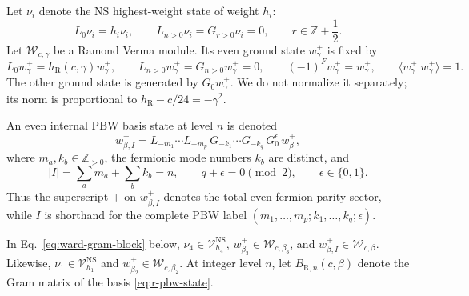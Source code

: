 \documentclass[11pt]{article}
\newcommand{\R}{\mathrm R}
\newcommand{\NS}{\mathrm{NS}}
\begin{document}
Let \(\nu_i\) denote the NS highest-weight state of weight \(h_i\):
\begin{equation}
 L_0\nu_i=h_i\nu_i,\qquad
 L_{n>0}\nu_i=G_{r>0}\nu_i=0,
 \qquad r\in\mathbb Z+\frac12.
 \label{eq:ns-highest-state}
\end{equation}
Let \(\mathcal W_{c,\gamma}\) be a Ramond Verma module.  Its even ground
state \(w_\gamma^+\) is fixed by
\begin{equation}
 L_0w_\gamma^+=h_\R(c,\gamma)w_\gamma^+,\qquad
 L_{n>0}w_\gamma^+=G_{n>0}w_\gamma^+=0,\qquad
 (-1)^F w_\gamma^+=w_\gamma^+,\qquad
 \langle w_\gamma^+|w_\gamma^+\rangle=1.
 \label{eq:r-ground-state}
\end{equation}
The other ground state is generated by \(G_0w_\gamma^+\).  We do not
normalize it separately; its norm is proportional to
\(h_\R-c/24=-\gamma^2\).

An even internal PBW basis state at level \(n\) is denoted
\begin{equation}
 w_{\beta,I}^+
 =
 L_{-m_1}\cdots L_{-m_p}\,
 G_{-k_1}\cdots G_{-k_q}\,
 G_0^{\epsilon}\,w_\beta^+,
 \label{eq:r-pbw-state}
\end{equation}
where \(m_a,k_b\in\mathbb Z_{>0}\), the fermionic mode numbers \(k_b\)
are distinct, and
\begin{equation}
 |I|=\sum_a m_a+\sum_b k_b=n,\qquad
 q+\epsilon=0\pmod 2,\qquad \epsilon\in\{0,1\}.
 \label{eq:r-pbw-label}
\end{equation}
Thus the superscript \(+\) on \(w_{\beta,I}^+\) denotes the total even
fermion-parity sector, while \(I\) is shorthand for the complete PBW
label \((m_1,\ldots,m_p;k_1,\ldots,k_q;\epsilon)\).

In Eq.~\eqref{eq:ward-gram-block} below,
\(\nu_4\in\mathcal V_{h_4}^{\NS}\),
\(w_{\beta_3}^+\in\mathcal W_{c,\beta_3}\), and
\(w_{\beta,I}^+\in\mathcal W_{c,\beta}\).  Likewise,
\(\nu_1\in\mathcal V_{h_1}^{\NS}\) and
\(w_{\beta_2}^+\in\mathcal W_{c,\beta_2}\).
At integer level \(n\), let \(B_{\R,n}(c,\beta)\) denote the Gram matrix
of the basis \eqref{eq:r-pbw-state}.
\end{document}
